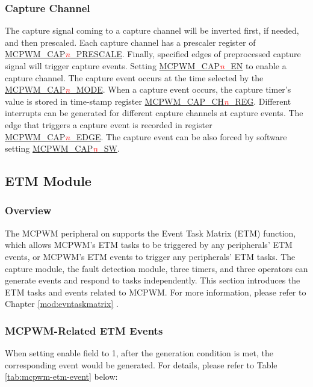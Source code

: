 \documentclass[main\_\_EN.tex]{subfiles}
\begin{document}
\subsubsection{Capture Channel}
The capture signal coming to a capture channel will be inverted first, if needed, and then prescaled. Each capture channel has a prescaler register of \hyperref[fielddesc:MCPWMCAPNPRESCALE]{MCPWM\_CAP\textcolor{red}{\it{n}}\_PRESCALE}. Finally, specified edges of preprocessed capture signal will trigger capture events. Setting \hyperref[fielddesc:MCPWMCAPNEN]{MCPWM\_CAP\textcolor{red}{\it{n}}\_EN} to enable a capture channel. The capture event occurs at the time selected by the \hyperref[fielddesc:MCPWMCAPNMODE]{MCPWM\_CAP\textcolor{red}{\it{n}}\_MODE}. When a capture event occurs, the capture timer's value is stored in time-stamp register \hyperref[regdesc:MCPWMCAPCHNREG]{MCPWM\_CAP\_CH\textcolor{red}{\it{n}}\_REG}. Different interrupts can be generated for different capture channels at capture events. The edge that triggers a capture event is recorded in register \hyperref[fielddesc:MCPWMCAPNEDGE]{MCPWM\_CAP\textcolor{red}{\it{n}}\_EDGE}. The capture event can be also forced by software setting \hyperref[fielddesc:MCPWMCAPNSW]{MCPWM\_CAP\textcolor{red}{\it{n}}\_SW}.

\subsection{ETM Module}

\subsubsection{Overview}
The MCPWM peripheral on \chipname{} supports the Event Task Matrix (ETM) function, which allows MCPWM's ETM tasks to be triggered by any peripherals' ETM events, or MCPWM's ETM events to trigger any peripherals' ETM tasks. The capture module, the fault detection module, three timers, and three operators can generate events and respond to tasks independently. This section introduces the ETM tasks and events related to MCPWM. For more information, please refer to Chapter \ref{mod:evntaskmatrix} .
\subsubsection{MCPWM-Related ETM Events}

When setting enable field to 1, after the generation condition is met, the corresponding event would be generated. For details, please refer to Table \ref{tab:mcpwm-etm-event} below:
\end{document}
